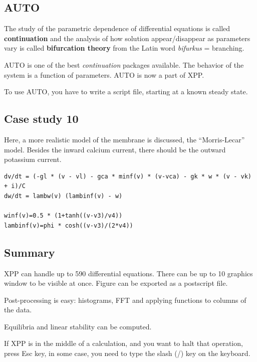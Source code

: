 \subsection{AUTO}
\label{sec:auto}

The study of the parametric dependence of differential equations is
called {\bf continuation} and the analysis of how solution
appear/disappear as parameters vary is called {\bf bifurcation theory}
from the Latin word {\it bifurkus} = branching.

AUTO is one of the best {\it continuation} packages available. The
behavior of the system is a function of parameters. AUTO is now a part
of XPP.

To use AUTO, you have to write a script file, starting at a known
steady state.

\subsection{Case study 10}
\label{sec:case-study-10}

Here, a more realistic model of the membrane is discussed, the
``Morris-Lecar'' model. Besides the inward calcium current, there
should be the outward potassium current.

\begin{verbatim}
dv/dt = (-gl * (v - vl) - gca * minf(v) * (v-vca) - gk * w * (v - vk)
+ i)/C
dw/dt = lambw(v) (lambinf(v) - w)

winf(v)=0.5 * (1+tanh((v-v3)/v4))
lambinf(v)=phi * cosh((v-v3)/(2*v4))

\end{verbatim}


\subsection{Summary }
\label{sec:summary-}


XPP can handle up to 590 differential equations. There can be up to 10
graphics window to be visible at once. Figure can be exported as a
postscript file. 

Post-processing is easy: histograms, FFT and applying functions to
columns of the data.

Equilibria and linear stability can be computed.



If XPP is in the middle of a calculation, and you want to halt that
operation, press Esc key, in some case,
you need to type the slash (/) key on the keyboard.


